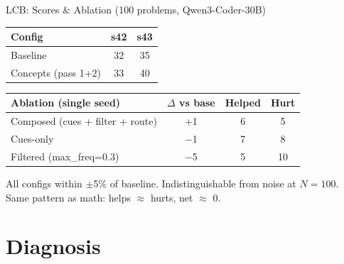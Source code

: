 \documentclass[10pt]{beamer}
\begin{document}
\begin{frame}{LCB: Scores \& Ablation (100 problems, Qwen3-Coder-30B)}
  \begin{table}
    \footnotesize
    \begin{tabular}{@{} l cc @{}}
      \toprule
      Config & s42 & s43 \\
      \midrule
      Baseline & 32 & 35 \\
      Concepts (pass 1+2) & 33 & 40 \\
      \bottomrule
    \end{tabular}
  \end{table}

  \vspace{0.3em}
  \begin{table}
    \footnotesize
    \begin{tabular}{@{} l c c c @{}}
      \toprule
      Ablation (single seed) & $\Delta$ vs base & Helped & Hurt \\
      \midrule
      Composed (cues + filter + route) & +1 & 6 & 5 \\
      Cues-only & $-$1 & 7 & 8 \\
      Filtered (max\_freq=0.3) & $-$5 & 5 & 10 \\
      \bottomrule
    \end{tabular}
  \end{table}

  \vspace{0.5em}
  {\footnotesize All configs within $\pm$5\% of baseline. Indistinguishable from noise at $N{=}100$.\\
  Same pattern as math: helps $\approx$ hurts, net $\approx$ 0.}
\end{frame}

\section{Diagnosis}
\end{document}
